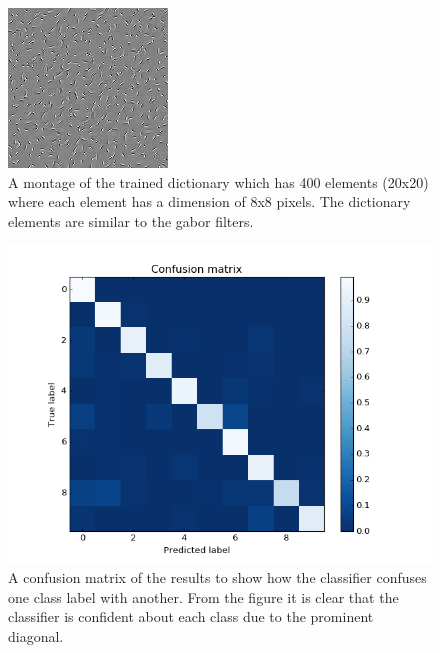 \documentclass[	DIV=calc,%
				paper=a4,%
				fontsize=11pt,%
				twocolumn]{scrartcl}	 %
\begin{document}
\begin{figure}[H]
    \centering
    \includegraphics[width=0.7\linewidth]{data/sc_data/sc_mnist_dictionary.jpg}
    \caption{A montage of the trained dictionary which has 400 elements (20x20) where each element has a dimension of 8x8 pixels. The dictionary elements are similar to the gabor filters.}
    \label{sc_mnist_dictionary}
\end{figure}

\begin{figure}[H]
    \centering
    \includegraphics[width=1.0\linewidth]{data/sc_data/sc_mnist_confusion_matrix.png}
    \caption{A confusion matrix of the results to show how the classifier confuses one class label with another. From the figure it is clear that the classifier is confident about each class due to the prominent diagonal.}
    \label{sc_mnist_confusion_matrix}
\end{figure}
\end{document}
